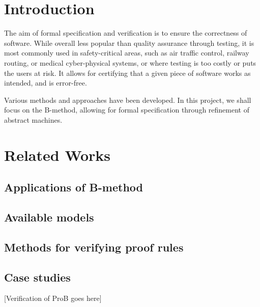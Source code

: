\documentclass[11pt,journal]{IEEEtran}
\begin{document}
	
	\IEEEpeerreviewmaketitle
	
	
	
	\section{Introduction}
	The aim of formal specification and verification is to ensure the correctness of software. While overall less popular than quality assurance through testing, it is most commonly used in safety-critical areas, such as air traffic control, railway routing, or medical cyber-physical systems, or where testing is too costly or puts the users at risk. It allows for certifying that a given piece of software works as intended, and is error-free.
	
	Various methods and approaches have been developed. In this project, we shall focus on the B-method, allowing for formal specification through refinement of abstract machines.
	\section{Related Works}
	
	\subsection{Applications of B-method}
	
	\subsection{Available models}
	
	\subsection{Methods for verifying proof rules}
	
	\subsection{Case studies}
	
	[Verification of ProB goes here]
	
\end{document}
